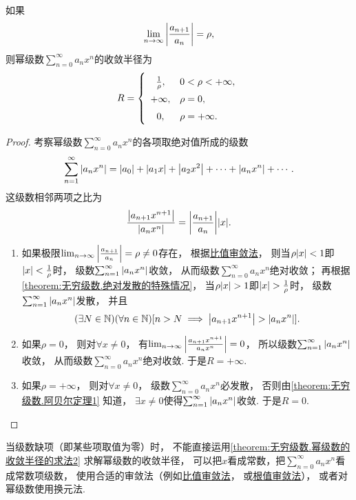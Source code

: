 \begin{theorem}\label{theorem:无穷级数.幂级数的收敛半径的求法2}
如果\[
	\lim_{n\to\infty} \abs{\frac{a_{n+1}}{a_n}} = \rho,
\]
则幂级数\(\sum_{n=0}^\infty a_n x^n\)的收敛半径为\[
	R = \left\{ \def\arraystretch{1.5} \begin{array}{cl}
		\frac1\rho, & 0<\rho<+\infty, \\
		+\infty, & \rho = 0, \\
		0, & \rho = +\infty. \\
	\end{array} \right.
\]
\begin{proof}
考察幂级数\(\sum_{n=0}^\infty a_n x^n\)的各项取绝对值所成的级数\[
	\sum_{n=1}^\infty \abs{a_n x^n}
	= \abs{a_0} + \abs{a_1 x} + \abs{a_2 x^2} + \dotsb + \abs{a_n x^n} + \dotsb.
\]
这级数相邻两项之比为\[
	\frac{\abs{a_{n+1} x^{n+1}}}{\abs{a_n x^n}}
	= \abs{\frac{a_{n+1}}{a_n}} \abs{x}.
\]

\begin{enumerate}
	\item 如果极限\(\lim_{n\to\infty} \abs{\frac{a_{n+1}}{a_n}} = \rho\neq0\)存在，
	根据\hyperref[theorem:无穷级数.正项级数的比值审敛法]{比值审敛法}，
	则当\(\rho \abs{x} < 1\)即\(\abs{x} < \frac1\rho\)时，
	级数\(\sum_{n=1}^\infty \abs{a_n x^n}\)收敛，
	从而级数\(\sum_{n=0}^\infty a_n x^n\)绝对收敛；
	再根据\cref{theorem:无穷级数.绝对发散的特殊情况}，
	当\(\rho \abs{x} > 1\)即\(\abs{x} > \frac1\rho\)时，
	级数\(\sum_{n=1}^\infty \abs{a_n x^n}\)发散，
	并且\[
		(\exists N\in\mathbb{N})
		(\forall n\in\mathbb{N})
		[
			n > N
			\implies
			\abs{a_{n+1} x^{n+1}} > \abs{a_n x^n}
		].
	\]

	\item 如果\(\rho=0\)，
	则对\(\forall x\neq0\)，
	有\(\lim_{n\to\infty} \abs{\frac{a_{n+1} x^{n+1}}{a_n x^n}} = 0\)，
	所以级数\(\sum_{n=1}^\infty \abs{a_n x^n}\)收敛，
	从而级数\(\sum_{n=0}^\infty a_n x^n\)绝对收敛.
	于是\(R=+\infty\).
		\item 如果\(\rho=+\infty\)，
	则对\(\forall x\neq0\)，
	级数\(\sum_{n=0}^\infty a_n x^n\)必发散，
	否则由\cref{theorem:无穷级数.阿贝尔定理1} 知道，
	\(\exists x\neq0\)使得\(\sum_{n=1}^\infty \abs{a_n x^n}\)收敛.
	于是\(R=0\).
	\qedhere
\end{enumerate}
\end{proof}
\end{theorem}
\begin{remark}
当级数缺项（即某些项取值为零）时，
不能直接运用\cref{theorem:无穷级数.幂级数的收敛半径的求法2} 求解幂级数的收敛半径，
可以把\(x\)看成常数，把\(\sum_{n=0}^\infty a_n x^n\)看成常数项级数，
使用合适的审敛法（例如\hyperref[theorem:无穷级数.正项级数的比值审敛法]{比值审敛法}，
或\hyperref[theorem:无穷级数.正项级数的根值审敛法]{根值审敛法}），
或者对幂级数使用换元法.
\end{remark}


